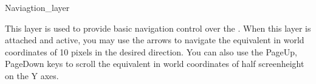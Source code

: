 
\begin{ccRefClass}{Naviagtion_layer}


\ccInheritsFrom
{}

\ccGlue

\ccCreation
{}


This layer is used to provide basic navigation control over the 
. When this layer is attached and active, you may use 
the arrows to navigate the equivalent in world coordinates of 10 pixels 
in the desired direction. You can also use the PageUp, PageDown keys to 
scroll the equivalent in world coordinates of half screenheight on the Y axes.


\end{ccRefClass}









